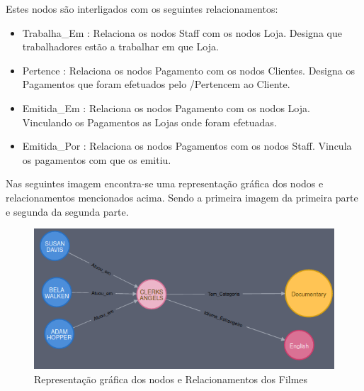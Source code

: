 Estes nodos são interligados com os seguintes relacionamentos:

\begin{itemize}

\item Trabalha\_Em : Relaciona os nodos Staff com os nodos Loja. Designa que trabalhadores estão a trabalhar em que Loja.
\hfill\\
\item Pertence : Relaciona os nodos Pagamento com os nodos Clientes. Designa os Pagamentos que foram efetuados pelo /Pertencem ao Cliente.
\hfill\\
\item Emitida\_Em : Relaciona os nodos Pagamento com os nodos Loja. Vinculando os Pagamentos as Lojas onde foram efetuadas.
\hfill\\
\item Emitida\_Por : Relaciona os nodos Pagamentos com os nodos Staff. Vincula os pagamentos com que os emitiu.

\end{itemize}

Nas seguintes imagem encontra-se uma representação gráfica dos nodos e relacionamentos mencionados acima. Sendo a primeira imagem da primeira parte e segunda  da segunda parte.

\begin{figure}[H]

  \centering

  \includegraphics[width=\textwidth]{Movie.png}

  \caption {Representação gráfica dos nodos e Relacionamentos dos Filmes}

  \label {fig:Filme}

\end{figure}


